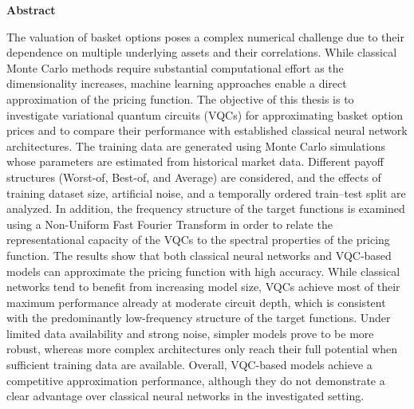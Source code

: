 %
%
\vspace*{2cm}

\begin{center}
    \textbf{Abstract}
\end{center}

\vspace*{1cm}

\noindent The valuation of basket options poses a complex numerical challenge due to their dependence on multiple underlying assets and their correlations. While classical Monte Carlo methods require substantial computational effort as the dimensionality increases, machine learning approaches enable a direct approximation of the pricing function. The objective of this thesis is to investigate variational quantum circuits (VQCs) for approximating basket option prices and to compare their performance with established classical neural network architectures. The training data are generated using Monte Carlo simulations whose parameters are estimated from historical market data. Different payoff structures (Worst-of, Best-of, and Average) are considered, and the effects of training dataset size, artificial noise, and a temporally ordered train–test split are analyzed. In addition, the frequency structure of the target functions is examined using a Non-Uniform Fast Fourier Transform in order to relate the representational capacity of the VQCs to the spectral properties of the pricing function. The results show that both classical neural networks and VQC-based models can approximate the pricing function with high accuracy. While classical networks tend to benefit from increasing model size, VQCs achieve most of their maximum performance already at moderate circuit depth, which is consistent with the predominantly low-frequency structure of the target functions. Under limited data availability and strong noise, simpler models prove to be more robust, whereas more complex architectures only reach their full potential when sufficient training data are available. Overall, VQC-based models achieve a competitive approximation performance, although they do not demonstrate a clear advantage over classical neural networks in the investigated setting.